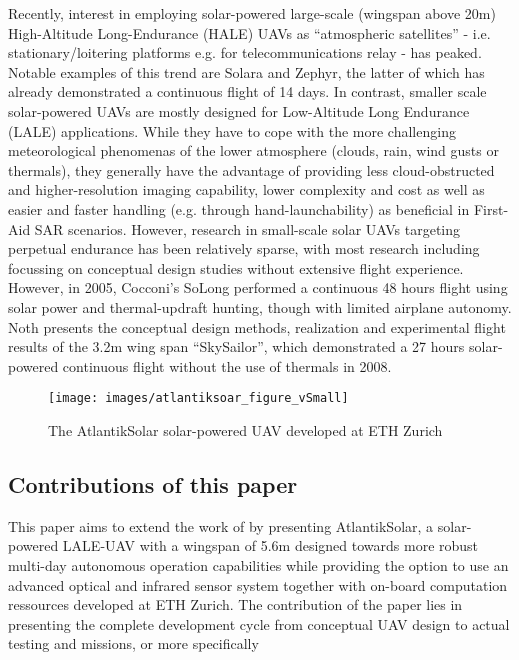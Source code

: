 Recently, interest in employing solar-powered large-scale (wingspan above 20m) High-Altitude Long-Endurance (HALE) UAVs as ``atmospheric satellites'' - i.e. stationary/loitering platforms e.g. for telecommunications relay - has peaked. Notable examples of this trend are Solara \cite{IEEE_AtmosphericSatellites} and Zephyr, the latter of which has already demonstrated a continuous flight of 14 days\cite{QinetiQ_Zephyr14dayRecord}. In contrast, smaller scale solar-powered UAVs are mostly designed for Low-Altitude Long Endurance (LALE) applications. While they have to cope with the more challenging meteorological phenomenas of the lower atmosphere (clouds, rain, wind gusts or thermals), they generally have the advantage of providing less cloud-obstructed and higher-resolution imaging capability, lower complexity and cost as well as easier and faster handling (e.g. through hand-launchability) as beneficial in First-Aid SAR scenarios. However, research in small-scale solar UAVs targeting perpetual endurance has been relatively sparse, with most research including \cite{Morton_ICRA2013} focussing on conceptual design studies without extensive flight experience. However, in 2005, Cocconi's SoLong \cite{Cocconi_SoLong} performed a continuous 48 hours flight using solar power and thermal-updraft hunting, though with limited airplane autonomy. Noth\cite{Noth_PhD} presents the conceptual design methods, realization and experimental flight results of the 3.2m wing span ``SkySailor'', which demonstrated a 27 hours solar-powered continuous flight without the use of thermals in 2008. 
\begin{figure}[b]
    \centering
    \texttt{[image: images/atlantiksoar\_figure\_vSmall]}
    \caption{The AtlantikSolar solar-powered UAV developed at ETH Zurich}
    \label{fig:AtlantikSolarCollage}
\end{figure}

\subsection{Contributions of this paper}

This paper aims to extend the work of \cite{Cocconi_SoLong,Noth_PhD} by presenting AtlantikSolar, a solar-powered LALE-UAV with a wingspan of 5.6m designed towards more robust multi-day autonomous operation capabilities while providing the option to use an advanced optical and infrared sensor system together with on-board computation ressources developed at ETH Zurich. The contribution of the paper lies in presenting the complete development cycle from conceptual UAV design to actual testing and missions, or more specifically
  
